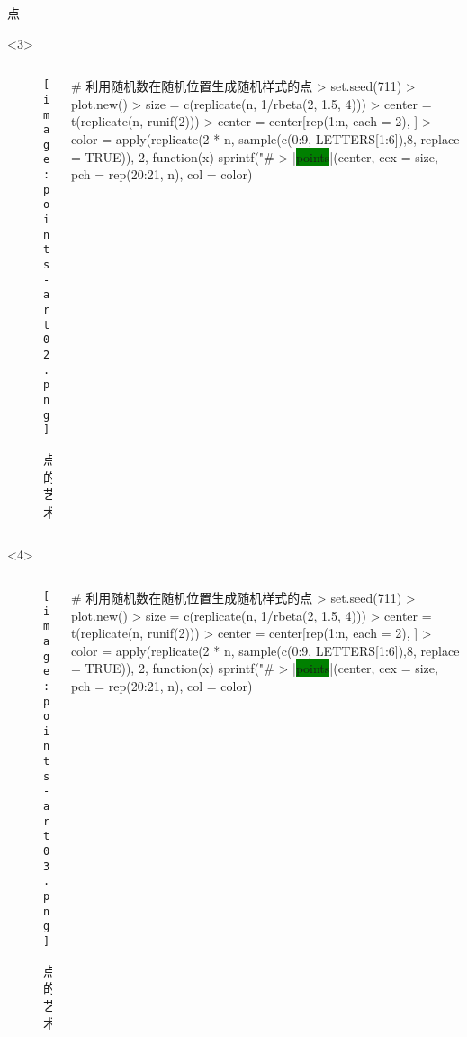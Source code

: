 \begin{frame}[t,fragile]{\subsecname}{点}
\begin{overlayarea}{\textwidth}{\textheight}
\begin{onlyenv}<3>
  \begin{columns}
    \begin{column}{.4\textwidth}
\centering
\begin{figure}
  \texttt{[image: points-art02.png]}
  \caption{点的艺术}
\end{figure}
    \end{column}

    \begin{column}{.6\textwidth}
\centering
\begin{rcode}
# 利用随机数在随机位置生成随机样式的点
> set.seed(711)
> plot.new()
> size = c(replicate(n, 1/rbeta(2, 1.5, 4)))
> center = t(replicate(n, runif(2)))
> center = center[rep(1:n, each = 2), ]
> color = apply(replicate(2 * n, sample(c(0:9, LETTERS[1:6]),8, replace = TRUE)),
              2, function(x) sprintf("#%
> |\colorbox{green}{points}|(center, cex = size, pch = rep(20:21, n), col = color)
\end{rcode}
    \end{column}
  \end{columns}
\end{onlyenv}

\begin{onlyenv}<4>
  \begin{columns}
    \begin{column}{.4\textwidth}
\centering
\begin{figure}
    \texttt{[image: points-art03.png]}
    \caption{点的艺术}
\end{figure}
    \end{column}

    \begin{column}{.6\textwidth}
\centering
\begin{rcode}
# 利用随机数在随机位置生成随机样式的点
> set.seed(711)
> plot.new()
> size = c(replicate(n, 1/rbeta(2, 1.5, 4)))
> center = t(replicate(n, runif(2)))
> center = center[rep(1:n, each = 2), ]
> color = apply(replicate(2 * n, sample(c(0:9, LETTERS[1:6]),8, replace = TRUE)),
              2, function(x) sprintf("#%
> |\colorbox{green}{points}|(center, cex = size, pch = rep(20:21, n), col = color)
\end{rcode}
    \end{column}
  \end{columns}
\end{onlyenv}


\end{overlayarea}
\end{frame}
